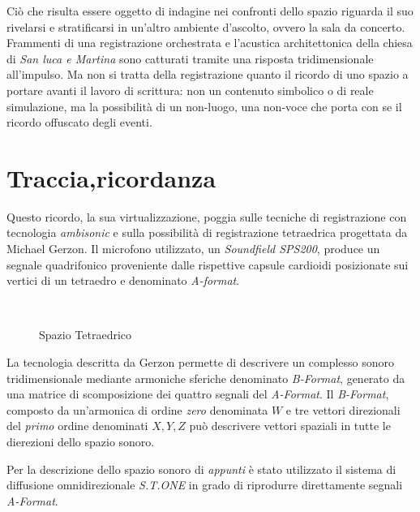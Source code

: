 Ciò che risulta essere oggetto di indagine nei confronti dello spazio riguarda
il suo rivelarsi e stratificarsi in un'altro ambiente d'ascolto, ovvero la sala da concerto.
Frammenti di una registrazione orchestrata e l'acustica architettonica della
chiesa di \emph{San luca e Martina} sono catturati tramite una  risposta tridimensionale all'impulso.
Ma non si tratta della registrazione quanto il ricordo  di uno spazio a portare
avanti il lavoro di scrittura: non un contenuto simbolico o di reale simulazione,
ma la possibilità di  un non-luogo, una non-voce che porta con se il ricordo offuscato degli eventi.

\section*{Traccia,ricordanza}
\label{sec:ricordanza}

Questo ricordo, la sua virtualizzazione, poggia sulle tecniche di registrazione
con tecnologia \emph{ambisonic} e sulla possibilità di registrazione tetraedrica
progettata da Michael Gerzon. Il microfono utilizzato, un \emph{Soundfield SPS200},
produce un segnale quadrifonico proveniente dalle rispettive capsule cardioidi posizionate
sui vertici di un tetraedro e denominato \emph{A-format}.

\begin{figure}
\centering
{} \quad
{} \\
\caption[Spazio Tetraedrico]{Spazio Tetraedrico}
\label{fig:tetratetra}
\end{figure}


La tecnologia descritta da Gerzon permette di descrivere un complesso sonoro
tridimensionale mediante armoniche sferiche denominato \emph{B-Format},
generato da una matrice di scomposizione dei quattro segnali del \emph{A-Format}.
Il \emph{B-Format}, composto da un'armonica di ordine \emph{zero} denominata $ W $
e tre vettori direzionali del \emph{primo} ordine denominati $ X, Y, Z $ può descrivere
vettori spaziali in tutte le dierezioni dello spazio sonoro.

Per la descrizione dello spazio sonoro di \emph{appunti} è stato utilizzato il
sistema di diffusione omnidirezionale \emph{S.T.ONE} in grado di riprodurre direttamente
segnali \emph{A-Format}.

